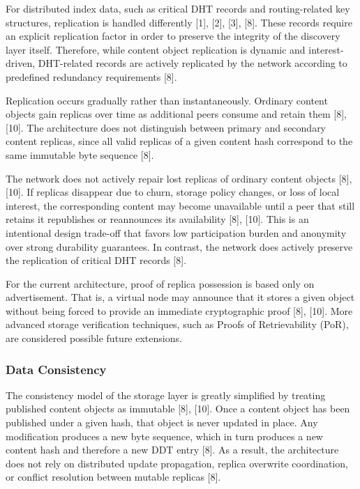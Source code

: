 \documentclass[12pt,a4paper]{article}
\begin{document}
For distributed index data, such as critical DHT records and routing-related key structures, replication is handled differently [1], [2], [3], [8]. These records require an explicit replication factor in order to preserve the integrity of the discovery layer itself. Therefore, while content object replication is dynamic and interest-driven, DHT-related records are actively replicated by the network according to predefined redundancy requirements [8].

Replication occurs gradually rather than instantaneously. Ordinary content objects gain replicas over time as additional peers consume and retain them [8], [10]. The architecture does not distinguish between primary and secondary content replicas, since all valid replicas of a given content hash correspond to the same immutable byte sequence [8].

The network does not actively repair lost replicas of ordinary content objects [8], [10]. If replicas disappear due to churn, storage policy changes, or loss of local interest, the corresponding content may become unavailable until a peer that still retains it republishes or reannounces its availability [8], [10]. This is an intentional design trade-off that favors low participation burden and anonymity over strong durability guarantees. In contrast, the network does actively preserve the replication of critical DHT records [8].

For the current architecture, proof of replica possession is based only on advertisement. That is, a virtual node may announce that it stores a given object without being forced to provide an immediate cryptographic proof [8], [10]. More advanced storage verification techniques, such as Proofs of Retrievability (PoR), are considered possible future extensions.

\subsubsection{Data Consistency}

The consistency model of the storage layer is greatly simplified by treating published content objects as immutable [8], [10]. Once a content object has been published under a given hash, that object is never updated in place. Any modification produces a new byte sequence, which in turn produces a new content hash and therefore a new DDT entry [8]. As a result, the architecture does not rely on distributed update propagation, replica overwrite coordination, or conflict resolution between mutable replicas [8].
\end{document}
